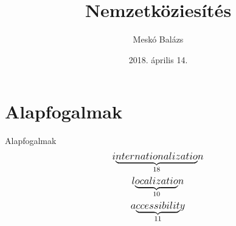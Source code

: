 \documentclass{beamer}
\title{Nemzetköziesítés}
\date{2018. április 14.}
\author{Meskó Balázs}
\institute{FreeCodeCamp}
\begin{document}
  \maketitle
  \section{Alapfogalmak}
  \begin{frame}{Alapfogalmak}
    \begin{gather*}
	\mathlarger{i{\underbrace{nternationalizatio}_{\text{18}}}n}\\
    \mathlarger{l{\underbrace{ocalizatio}_{\text{10}}}n}\\
    \mathlarger{a{\underbrace{ccessibilit}_{\text{11}}}y}
    \end{gather*}
  \end{frame}
\end{document}
